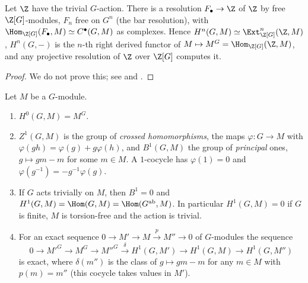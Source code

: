 \begin{theorem}\label{thm:cohomology:as-ext}
Let $\Z$ have the trivial $G$-action. There is a resolution $F_\bullet\to\Z$ of $\Z$ by free $\Z[G]$-modules, $F_n$ free on $G^n$ (the bar resolution), with
$\Hom_{\Z[G]}(F_\bullet,M)\simeq C^\bullet(G,M)$ as complexes. Hence $H^n(G,M)\simeq\Ext^n_{\Z[G]}(\Z,M)$, $H^n(G,-)$ is the $n$-th right derived functor of
$M\mapsto M^G=\Hom_{\Z[G]}(\Z,M)$, and any projective resolution of $\Z$ over $\Z[G]$ computes it.
\end{theorem}

\begin{proof}
We do not prove this; see \cite[Chapter I, Section 5 and Chapter III, Section 1]{Brown} and \cite[Section 6.5]{Weibel}.
\end{proof}

\begin{proposition}[$H^0$ and $H^1$]\label{prop:cohomology:h0-h1}
Let $M$ be a $G$-module.
\begin{enumerate}[label=(\roman*)]
\item $H^0(G,M)=M^G$.
\item $Z^1(G,M)$ is the group of \emph{crossed homomorphisms}, the maps $\varphi\colon G\to M$ with $\varphi(gh)=\varphi(g)+g\varphi(h)$, and $B^1(G,M)$ the group of
\emph{principal} ones, $g\mapsto gm-m$ for some $m\in M$. A $1$-cocycle has $\varphi(1)=0$ and $\varphi(g^{-1})=-g^{-1}\varphi(g)$.
\item If $G$ acts trivially on $M$, then $B^1=0$ and $H^1(G,M)=\Hom(G,M)=\Hom(G^{\mathrm{ab}},M)$. In particular $H^1(G,M)=0$ if $G$ is finite, $M$ is
torsion-free and the action is trivial.
\item For an exact sequence $0\to M'\to M\xrightarrow{p}M''\to0$ of $G$-modules the sequence
\[
0\to M'^G\to M^G\to M''^G\xrightarrow{\ \delta\ }H^1(G,M')\to H^1(G,M)\to H^1(G,M'')
\]
is exact, where $\delta(m'')$ is the class of $g\mapsto gm-m$ for any $m\in M$ with $p(m)=m''$ (this cocycle takes values in $M'$).
\end{enumerate}
\end{proposition}

